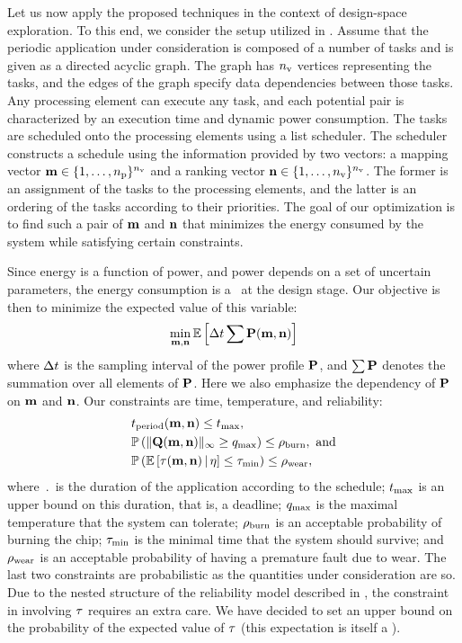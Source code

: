 Let us now apply the proposed techniques in the context of design-space exploration.
To this end, we consider the setup utilized in \cite{ukhov2012}.
Assume that the periodic application under consideration is composed of a number of tasks and is given as a directed acyclic graph.
The graph has ${n_\text{v}}$ vertices representing the tasks, and the edges of the graph specify data dependencies between those tasks.
Any processing element can execute any task, and each potential pair is characterized by an execution time and dynamic power consumption.
The tasks are scheduled onto the processing elements using a list scheduler.
The scheduler constructs a schedule using the information provided by two vectors: a mapping vector $\mathbf{m} \in \{ 1, \dotsc, {n_\text{p}} \}^{n_\text{v}}$ and a ranking vector $\mathbf{n} \in \{ 1, \dotsc, {n_\text{v}} \}^{n_\text{v}}$.
The former is an assignment of the tasks to the processing elements, and the latter is an ordering of the tasks according to their priorities.
The goal of our optimization is to find such a pair of $\mathbf{m}$ and $\mathbf{n}$ that minimizes the energy consumed by the system while satisfying certain constraints.

Since energy is a function of power, and power depends on a set of uncertain parameters, the energy consumption is a \rv\ at the design stage.
Our objective is then to minimize the expected value of this variable:
\begin{equation} \elab{objective}
  \min_{\mapping, \priority} \expectation{\dt \sum \mP(\mapping, \priority)}
\end{equation}
where $\Delta t$ is the sampling interval of the power profile $\mathbf{P}$, and $\sum \mathbf{P}$ denotes the summation over all elements of $\mathbf{P}$.
Here we also emphasize the dependency of $\mathbf{P}$ on $\mathbf{m}$ and $\mathbf{n}$.
Our constraints are time, temperature, and reliability:
\begin{align}
  & \period(\mapping, \priority) \leq \t_\maximal, \elab{timing-constraint} \\
  & \probabilityMeasure\left( \norm[\infty]{\mQ(\mapping, \priority)} \geq \q_\maximal \right) \leq \pr_\burn, \text{ and} \elab{thermal-constraint} \\
  & \probabilityMeasure\left( \expectation{\T(\mapping, \priority) \, | \, \eta} \leq \T_\minimal \right) \leq \pr_\wear, \elab{reliability-constraint}
\end{align}
where $\period$ is the duration of the application according to the schedule; $t_{\text{max}}$ is an upper bound on this duration, that is, a deadline; $q_{\text{max}}$ is the maximal temperature that the system can tolerate; $\rho_{\text{burn}}$ is an acceptable probability of burning the chip; $\tau_{\text{min}}$ is the minimal time that the system should survive; and $\rho_{\text{wear}}$ is an acceptable probability of having a premature fault due to wear.
The last two constraints are probabilistic as the quantities under consideration are so.
Due to the nested structure of the reliability model described in , the constraint in  involving $\tau$ requires an extra care.
We have decided to set an upper bound on the probability of the expected value of $\tau$ (this expectation is itself a \rv).

